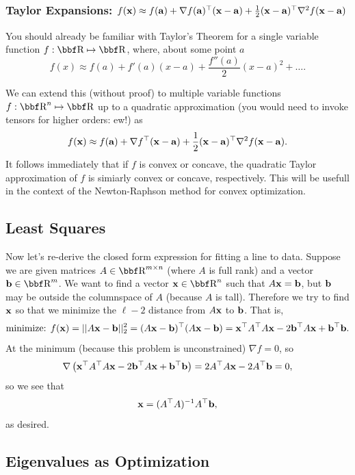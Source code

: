 \documentclass{article}
\begin{document}
\subsubsection{Taylor Expansions: $f({\bf x}) \approx f({\bf a}) + \nabla f({\bf a})^\top ({\bf x}-{\bf a}) + \frac{1}{2}({\bf x}-{\bf a})^\top \nabla^2 f ({\bf x}-{\bf a})$}

You should already be familiar with Taylor's Theorem for a single variable function
$f : \RR \mapsto \RR$, where, about some point $a$
\[
    f(x) \approx f(a) + f'(a)(x-a) + \frac{f''(a)}{2}(x-a)^2 + \dots.
\]

We can extend this (without proof) to multiple variable functions
$f : \RR^n \mapsto \RR$ up to a quadratic approximation (you would need
to invoke tensors for higher orders: ew!) as
\[
    f({\bf x}) \approx f({\bf a}) + \nabla f^\top({\bf x}-{\bf a}) + \frac{1}{2}({\bf x}-{\bf a})^\top \nabla^2 f ({\bf x}-{\bf a}).
\]
It follows immediately that if $f$ is convex or concave, the quadratic
Taylor approximation of $f$ is simiarly convex or concave, respectively.
This will be usefull in the context of the Newton-Raphson method for
convex optimization.

\subsection{Least Squares}

Now let's re-derive the closed form expression for fitting a line
to data. Suppose we are given matrices $A\in\RR^{m\times n}$ (where
$A$ is full rank) and a vector $\bb\in\RR^m$. We want to find a vector
$\xx\in\RR^n$ such that $A{\bf x}={\bf b}$, but ${\bf b}$ may be outside the
columnspace of $A$ (because $A$ is tall). Therefore we try to find
${\bf x}$ so that we minimize the $\ell-2$ distance from $A{\bf x}$ to ${\bf b}$.
That is,
\[
    \text{minimize: } f({\bf x}) = ||A{\bf x} - {\bf b}||_2^2 = (A{\bf x} - {\bf b})^\top(A{\bf x}-{\bf b}) = {\bf x}^\top A^\top A{\bf x} - 2{\bf b}^\top A{\bf x} + {\bf b}^\top{\bf b}.
\]
At the minimum (because this problem is unconstrained) $\nabla f = 0$, so
\[
    \nabla \left({\bf x}^\top A^\top A{\bf x} - 2{\bf b}^\top A{\bf x} + {\bf b}^\top{\bf b}\right) = 2A^\top A{\bf x} - 2A^\top {\bf b} = 0,
\]
so we see that
\[
    {\bf x} = (A^\top A)^{-1}A^\top{\bf b},
\]
as desired.

\subsection{Eigenvalues as Optimization}
\end{document}
